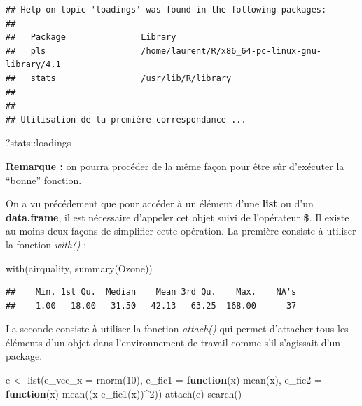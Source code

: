 \documentclass[
]{book}
\newenvironment{Shaded}{\begin{snugshade}}{\end{snugshade}}
\newcommand{\AttributeTok}[1]{\textcolor[rgb]{0.77,0.63,0.00}{#1}}
\newcommand{\ControlFlowTok}[1]{\textcolor[rgb]{0.13,0.29,0.53}{\textbf{#1}}}
\newcommand{\DecValTok}[1]{\textcolor[rgb]{0.00,0.00,0.81}{#1}}
\newcommand{\FunctionTok}[1]{\textcolor[rgb]{0.00,0.00,0.00}{#1}}
\newcommand{\NormalTok}[1]{#1}
\newcommand{\OtherTok}[1]{\textcolor[rgb]{0.56,0.35,0.01}{#1}}
\newcommand{\SpecialCharTok}[1]{\textcolor[rgb]{0.00,0.00,0.00}{#1}}
\theoremstyle{definition}
\theoremstyle{definition}
\theoremstyle{definition}
\theoremstyle{definition}
\theoremstyle{remark}
\begin{document}
\begin{verbatim}
## Help on topic 'loadings' was found in the following packages:
## 
##   Package               Library
##   pls                   /home/laurent/R/x86_64-pc-linux-gnu-library/4.1
##   stats                 /usr/lib/R/library
## 
## 
## Utilisation de la première correspondance ...
\end{verbatim}

\begin{Shaded}
\begin{Highlighting}[]
\NormalTok{?stats}\SpecialCharTok{::}\NormalTok{loadings}
\end{Highlighting}
\end{Shaded}

\textbf{Remarque :} on pourra procéder de la même façon pour être sûr d'exécuter la ``bonne'' fonction.

On a vu précédement que pour accéder à un élément d'une \textbf{list} ou d'un \textbf{data.frame}, il est nécessaire d'appeler cet objet suivi de l'opérateur \textbf{\$}. Il existe au moins deux façons de simplifier cette opération. La première consiste à utiliser la fonction \emph{with()} :

\begin{Shaded}
\begin{Highlighting}[]
\FunctionTok{with}\NormalTok{(airquality,}
     \FunctionTok{summary}\NormalTok{(Ozone))}
\end{Highlighting}
\end{Shaded}

\begin{verbatim}
##    Min. 1st Qu.  Median    Mean 3rd Qu.    Max.    NA's 
##    1.00   18.00   31.50   42.13   63.25  168.00      37
\end{verbatim}

La seconde consiste à utiliser la fonction \emph{attach()} qui permet d'attacher tous les éléments d'un objet dans l'environnement de travail comme s'il s'agissait d'un package.

\begin{Shaded}
\begin{Highlighting}[]
\NormalTok{e }\OtherTok{\textless{}{-}} \FunctionTok{list}\NormalTok{(}\AttributeTok{e\_vec\_x =} \FunctionTok{rnorm}\NormalTok{(}\DecValTok{10}\NormalTok{),}
          \AttributeTok{e\_fic1 =} \ControlFlowTok{function}\NormalTok{(x) }\FunctionTok{mean}\NormalTok{(x), }
          \AttributeTok{e\_fic2 =} \ControlFlowTok{function}\NormalTok{(x) }\FunctionTok{mean}\NormalTok{((x}\SpecialCharTok{{-}}\FunctionTok{e\_fic1}\NormalTok{(x))}\SpecialCharTok{\^{}}\DecValTok{2}\NormalTok{))}
\FunctionTok{attach}\NormalTok{(e)}
\FunctionTok{search}\NormalTok{()}
\end{Highlighting}
\end{Shaded}
\end{document}

